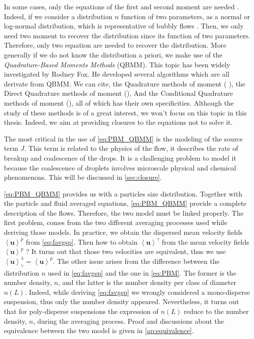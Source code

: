 In some cases, only the equations of the first and second moment are needed \citet{KAMP20011363}.
Indeed, if we consider  a distribution $n$ function of two parameters, as a normal or log-normal distribution, which is representative of bubbly flows \citep*{KAMP20011363}. 
Then, we only need two moment to recover the distribution since its function of two parameters. 
Therefore, only two equation are needed to recover the distribution. 
More generally if we do not know the distribution a priori, we make use of the \textit{Quadrature-Based Moments Methods} (QBMM).
This topic has been widely investigated by Rodney Fox.
He developed several algorithms which are all derivate from QBMM. 
We can cite, the Quadrature  methods of moment (\citet{marchisio2013computational} \citet{morel2015mathematical}\citet{marchisio2003quadrature}), the Direct Quadrature methods of moment (\citet{marchisio2005solution}), And the Conditional Quadrature methods of moment (\citet{yuan2011conditional}), all of which has their own specificities.  
Although the study of these methods is of a great interest, we won't focus on this topic in this thesis.
Indeed, we aim at providing closures to the equations not to solve it. 

The most critical in the use of \ref{eq:PBM_QBMM} is the modeling of the source term $J$.
This term is related to the physics of the flow, it describes the rate of breakup and coalescence of the drops.
It is a challenging problem to model it because the coalescence of droplets involves microscale physical and chemical phenomenons.
This will be discussed in \ref{sec:closure}.

\ref{eq:PBM_QBMM} provides us with a particles size distribution.
Together with the particle and fluid averaged equations, \ref{eq:PBM_QBMM} provide a complete description of the flows. 
Therefore, the two model must be linked properly.
The first problem, comes from the two different averaging processes used while deriving those models. 
In practice, we obtain the dispersed mean velocity fields $\left<\bm{u}\right>^p$ from \ref{eq:favgsp}.
Then how to obtain $\left<\bm{u}\right>^\gamma$ from the mean velocity fields $\left<\bm{u}\right>^p$ ?
It turns out that those two velocities are equivalent, thus we use $\left<\bm{u}\right>^\lambda_\gamma = \left<\bm{u}\right>^p$. 
The other issue arises from the difference between the distribution $n$ used in \ref{eq:favgsp} and the one in \ref{eq:PBM}.
The former is the number density, $n$, and the latter is the number density per class of diameter $n(L)$. 
Indeed, while deriving \ref{eq:favgsp} we wrongly considered a mono-disperse suspension, thus only the number density appeared.
Nevertheless, it turns out that for poly-disperse suspensions the expression of $n(L)$ reduce to the number density, $n$, during the averaging process.  
Proof and discussions about the equivalence between the two model is given in \ref{ap:equivalence}.    


